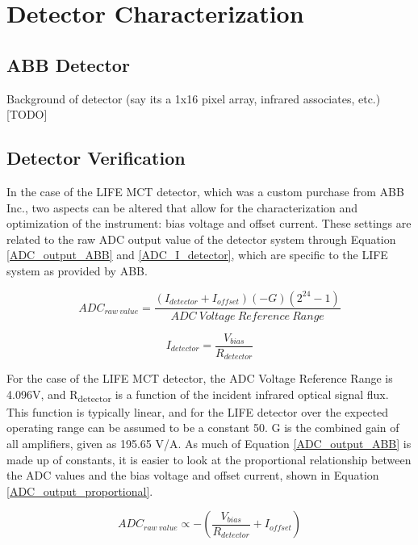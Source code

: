 \chapter{Detector Characterization} \label{detector}

\section{ABB Detector}
Background of detector (say its a 1x16 pixel array, infrared associates, etc.)
[TODO]

\section{Detector Verification}
In the case of the LIFE MCT detector, which was a custom purchase from ABB Inc., two aspects can be altered that allow for the characterization and optimization of the instrument: bias voltage and offset current. These settings are related to the raw ADC output value of the detector system through Equation \ref{ADC_output_ABB} and \ref{ADC_I_detector}, which are specific to the LIFE system as provided by ABB.

\begin{equation} \label{ADC_output_ABB}
    ADC_{raw\:value} = \frac{(I_{detector} + I_{offset})(-G)(2^{24}-1)}{ADC\:Voltage\:Reference\:Range}
\end{equation}

\begin{equation} \label{ADC_I_detector}
    I_{detector} = \frac{V_{bias}}{R_{detector}}
\end{equation}

For the case of the LIFE MCT detector, the ADC Voltage Reference Range is 4.096V, and R\textsubscript{detector} is a function of the incident infrared optical signal flux. This function is typically linear, and for the LIFE detector over the expected operating range can be assumed to be a constant 50\textOmega. G is the combined gain of all amplifiers, given as 195.65 V/A. As much of Equation \ref{ADC_output_ABB} is made up of constants, it is easier to look at the proportional relationship between the ADC values and the bias voltage and offset current, shown in Equation \ref{ADC_output_proportional}.

\begin{equation} \label{ADC_output_proportional}
    ADC_{raw\:value} \propto -\left(\frac{V_{bias}}{R_{detector}} + I_{offset}\right)
\end{equation}

